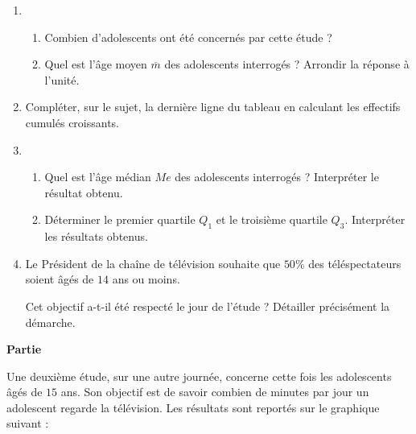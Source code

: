 \documentclass[12pt,french]{article}
\begin{document}
\begin{enumerate}[label=\arabic*.]
    \item 
        \begin{enumerate}[label=\alph*)]
            \item Combien d'adolescents ont été concernés par cette étude ?
            \item Quel est l'âge moyen $\overline m$ des adolescents interrogés ? Arrondir la réponse à l'unité.
        \end{enumerate}
    \item Compléter, sur le sujet, la dernière ligne du tableau en calculant les effectifs cumulés croissants.
    




    \item 
        \begin{enumerate}[label=\alph*)]
            \item Quel est l'âge médian $Me$ des adolescents interrogés ? Interpréter le résultat obtenu.
            \item Déterminer le premier quartile $Q_1$ et le troisième quartile $Q_3$. Interpréter les résultats obtenus.
            
        \end{enumerate}
    \item Le Président de la chaîne de télévision souhaite que $50\%$ des téléspectateurs soient âgés de $14$ ans ou moins.\par Cet objectif a-t-il été respecté le jour de l'étude ? Détailler précisément la démarche.
\end{enumerate}


\textbf{Partie} 

Une deuxième étude, sur une autre journée, concerne cette fois les adolescents âgés de $15$ ans. Son objectif est de savoir combien de minutes par jour un adolescent regarde la télévision. Les résultats sont reportés sur le graphique suivant :
\end{document}
